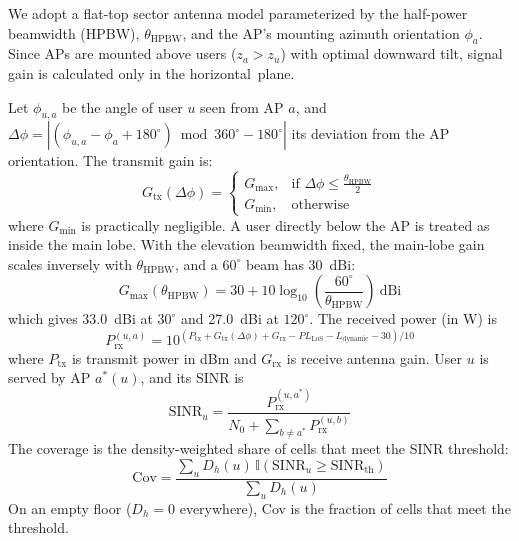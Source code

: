 \documentclass[conference]{IEEEtran}
\begin{document}
	We adopt a flat-top sector antenna model parameterized by the half-power beamwidth (HPBW), $\theta_{\text{HPBW}}$, and the AP's mounting azimuth orientation $\phi_a$. Since APs are mounted above users ($z_a > z_u$) with optimal downward tilt, signal gain is calculated only in the horizontal~plane.

	Let $\phi_{u,a}$ be the angle of user $u$ seen from AP $a$, and $\Delta\phi = |(\phi_{u,a} - \phi_a + 180^{\circ}) \bmod 360^{\circ} - 180^{\circ}|$ its deviation from the AP orientation. The transmit gain is:
	\begin{equation}
		G_{\text{tx}}(\Delta\phi) =
		\begin{cases}
			G_{\text{max}}, & \text{if } \Delta\phi \le \frac{\theta_{\text{HPBW}}}{2} \\
			G_{\text{min}}, & \text{otherwise}
		\end{cases}
		\label{eq:beamwidth}
	\end{equation}
	where $G_{\text{min}}$ is practically negligible. A user directly below the AP is treated as inside the main lobe. With the elevation beamwidth fixed, the main-lobe gain scales inversely with $\theta_{\text{HPBW}}$, and a $60^{\circ}$ beam has 30~dBi:
	\begin{equation}
		G_{\text{max}}(\theta_{\text{HPBW}}) = 30 + 10\log_{10}\left(\frac{60^{\circ}}{\theta_{\text{HPBW}}}\right)~\text{dBi}
		\label{eq:gain_bw}
	\end{equation}
	which gives 33.0~dBi at $30^{\circ}$ and 27.0~dBi at $120^{\circ}$. The received power (in W) is
	\begin{equation}
		P_{\text{rx}}^{(u,a)} = 10^{\left(P_{\text{tx}} + G_{\text{tx}}(\Delta\phi) + G_{\text{rx}} - PL_{\text{LoS}} - L_{\text{dynamic}} - 30\right)/10}
	\end{equation}
	where $P_{\text{tx}}$ is transmit power in dBm and $G_{\text{rx}}$ is receive antenna gain. User $u$ is served by AP $a^*(u)$, and its SINR is
	\begin{equation}
		\text{SINR}_u = \frac{P_{\text{rx}}^{(u,a^*)}}{N_0 + \sum_{b \ne a^*} P_{\text{rx}}^{(u,b)}}
		\label{eq:sinr_eval}
	\end{equation}
	The coverage is the density-weighted share of cells that meet the SINR threshold:
	\begin{equation}
		\text{Cov} = \frac{\sum_u D_h(u)\,\mathbb{I}(\text{SINR}_u \ge \text{SINR}_{\text{th}})}{\sum_u D_h(u)}
		\label{eq:coverage}
	\end{equation}
	On an empty floor ($D_h = 0$ everywhere), Cov is the fraction of cells that meet the threshold.
\end{document}
